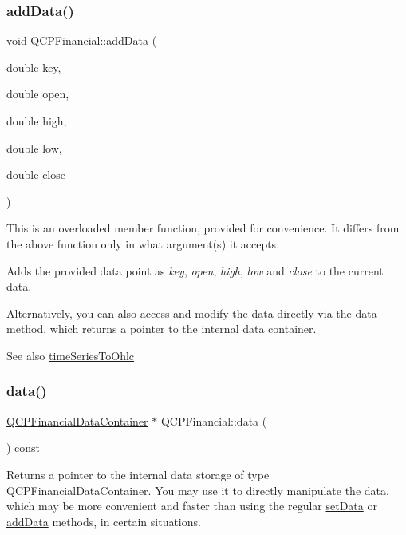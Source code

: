 \subsubsection{\texorpdfstring{add\+Data()}{addData()}\hspace{0.1cm}{\footnotesize\ttfamily [2/2]}}
{\footnotesize\ttfamily void Q\+C\+P\+Financial\+::add\+Data (\begin{DoxyParamCaption}\item[{double}]{key,  }\item[{double}]{open,  }\item[{double}]{high,  }\item[{double}]{low,  }\item[{double}]{close }\end{DoxyParamCaption})}

This is an overloaded member function, provided for convenience. It differs from the above function only in what argument(s) it accepts.

Adds the provided data point as {\itshape key}, {\itshape open}, {\itshape high}, {\itshape low} and {\itshape close} to the current data.

Alternatively, you can also access and modify the data directly via the \mbox{\hyperlink{class_q_c_p_financial_aec3f666271cf48bd7b87d84fe3f8c074}{data}} method, which returns a pointer to the internal data container.

\begin{DoxySeeAlso}{See also}
\mbox{\hyperlink{class_q_c_p_financial_a9a058c035040d3939b8884f4aaccb1a7}{time\+Series\+To\+Ohlc}} 
\end{DoxySeeAlso}
\mbox{\label{class_q_c_p_financial_aec3f666271cf48bd7b87d84fe3f8c074}} 
\subsubsection{\texorpdfstring{data()}{data()}}
{\footnotesize\ttfamily \mbox{\hyperlink{class_q_c_p_data_container}{Q\+C\+P\+Financial\+Data\+Container}} $\ast$ Q\+C\+P\+Financial\+::data (\begin{DoxyParamCaption}{ }\end{DoxyParamCaption}) const\hspace{0.3cm}{\ttfamily [inline]}}

Returns a pointer to the internal data storage of type Q\+C\+P\+Financial\+Data\+Container. You may use it to directly manipulate the data, which may be more convenient and faster than using the regular \mbox{\hyperlink{class_q_c_p_financial_a72089e75b8a50d18097526c3c79fdb85}{set\+Data}} or \mbox{\hyperlink{class_q_c_p_financial_a372ac031e44a7a6c912d203556af96f7}{add\+Data}} methods, in certain situations. \mbox{\label{class_q_c_p_financial_a15d68fb257113fef697356d65fa76559}} 
